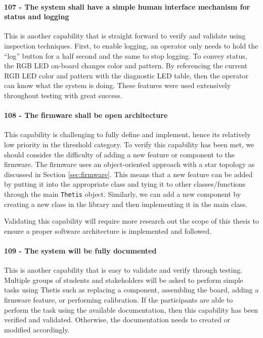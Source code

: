\paragraph*{107 - The system shall have a simple human interface mechanism for status and logging} This is another capability that is straight forward to verify and validate using inspection techniques.
First, to enable logging, an operator only needs to hold the ``log'' button for a half second and the same to stop logging.
To convey status, the RGB LED on-board changes color and pattern.
By referencing the current RGB LED color and pattern with the diagnostic LED table, then the operator can know what the system is doing.
These features were used extensively throughout testing with great success.

\paragraph*{108 - The firmware shall be open architecture} This capability is challenging to fully define and implement, hence its relatively low priority in the threshold category.
To verify this capability has been met, we should consider the difficulty of adding a new feature or component to the firmware.
The firmware uses an object-oriented approach with a star topology as discussed in Section \ref{sec:firmware}.
This means that a new feature can be added by putting it into the appropriate class and tying it to other classes/functions through the main \lstinline[style=customInline]|Thetis| object.
Similarly, we can add a new component by creating a new class in the library and then implementing it in the main class.

Validating this capability will require more research out the scope of this thesis to ensure a proper software architecture is implemented and followed.

\paragraph*{109 - The system will be fully documented} This is another capability that is easy to validate and verify through testing.
Multiple groups of students and stakeholders will be asked to perform simple tasks using Thetis such as replacing a component, assembling the board, adding a firmware feature, or performing calibration.
If the participants are able to perform the task using the available documentation, then this capability has been verified and validated.
Otherwise, the documentation needs to created or modified accordingly.


